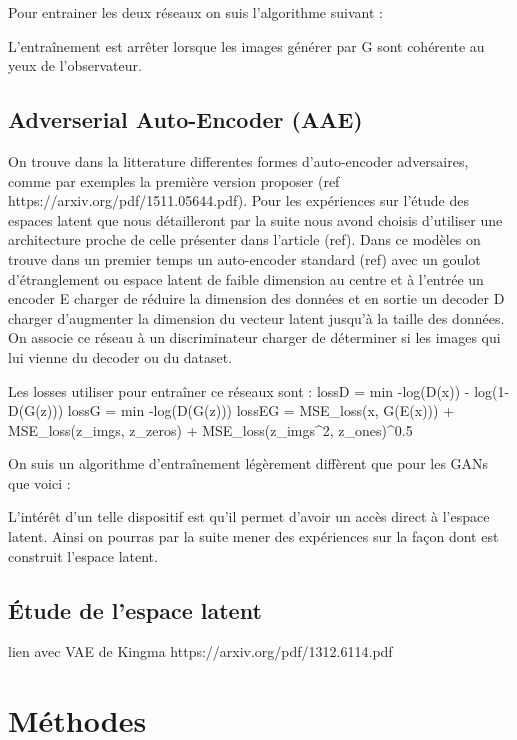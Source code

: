 \documentclass[11pt,francais]{article}
\begin{document}
Pour entrainer les deux réseaux on suis l'algorithme suivant :

L'entraînement est arrêter lorsque les images générer par G sont cohérente au yeux de l'observateur.

\subsection{Adverserial Auto-Encoder (AAE)}
On trouve dans la litterature differentes formes d'auto-encoder adversaires, comme par exemples la première version proposer (ref https://arxiv.org/pdf/1511.05644.pdf).
Pour les expériences sur l'étude des espaces latent que nous détailleront par la suite nous avond choisis d'utiliser une architecture proche de celle présenter dans l'article (ref).
Dans ce modèles on trouve dans un premier temps un auto-encoder standard (ref) avec un goulot d'étranglement ou espace latent de faible dimension au centre et à l'entrée un encoder E charger de réduire la dimension des données et en sortie un decoder D charger d'augmenter la dimension du vecteur latent jusqu'à la taille des données. On associe ce réseau à un discriminateur charger de déterminer si les images qui lui vienne du decoder ou du dataset.

Les losses utiliser pour entraîner ce réseaux sont :
lossD = min -log(D(x)) - log(1-D(G(z)))
lossG = min -log(D(G(z)))
lossEG = MSE_loss(x, G(E(x))) + MSE_loss(z_imgs, z_zeros) + MSE_loss(z_imgs^2, z_ones)^0.5

On suis un algorithme d'entraînement légèrement diffèrent que pour les GANs que voici :

L'intérêt d'un telle dispositif est qu'il permet d'avoir un accès direct à l'espace latent. Ainsi on pourras par la suite mener des expériences sur la façon dont est construit l'espace latent.


\subsection{Étude de l'espace latent}
lien avec VAE de Kingma https://arxiv.org/pdf/1312.6114.pdf

\section{Méthodes}
\end{document}
